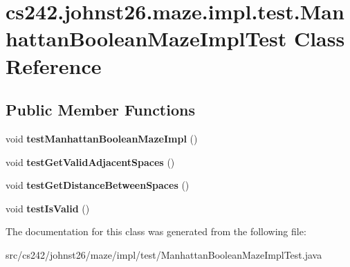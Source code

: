 \hypertarget{classcs242_1_1johnst26_1_1maze_1_1impl_1_1test_1_1_manhattan_boolean_maze_impl_test}{\section{cs242.\-johnst26.\-maze.\-impl.\-test.\-Manhattan\-Boolean\-Maze\-Impl\-Test Class Reference}
\label{classcs242_1_1johnst26_1_1maze_1_1impl_1_1test_1_1_manhattan_boolean_maze_impl_test}
}
\subsection*{Public Member Functions}
\begin{DoxyCompactItemize}
\item 
\hypertarget{classcs242_1_1johnst26_1_1maze_1_1impl_1_1test_1_1_manhattan_boolean_maze_impl_test_a801dfa6c57d9881a38e7dccedfca7fe4}{void {\bfseries test\-Manhattan\-Boolean\-Maze\-Impl} ()}\label{classcs242_1_1johnst26_1_1maze_1_1impl_1_1test_1_1_manhattan_boolean_maze_impl_test_a801dfa6c57d9881a38e7dccedfca7fe4}

\item 
\hypertarget{classcs242_1_1johnst26_1_1maze_1_1impl_1_1test_1_1_manhattan_boolean_maze_impl_test_a061886ff4c02d339433c1e258bcc86f2}{void {\bfseries test\-Get\-Valid\-Adjacent\-Spaces} ()}\label{classcs242_1_1johnst26_1_1maze_1_1impl_1_1test_1_1_manhattan_boolean_maze_impl_test_a061886ff4c02d339433c1e258bcc86f2}

\item 
\hypertarget{classcs242_1_1johnst26_1_1maze_1_1impl_1_1test_1_1_manhattan_boolean_maze_impl_test_a34cee0983384632ecd6b2a3dbb4b5032}{void {\bfseries test\-Get\-Distance\-Between\-Spaces} ()}\label{classcs242_1_1johnst26_1_1maze_1_1impl_1_1test_1_1_manhattan_boolean_maze_impl_test_a34cee0983384632ecd6b2a3dbb4b5032}

\item 
\hypertarget{classcs242_1_1johnst26_1_1maze_1_1impl_1_1test_1_1_manhattan_boolean_maze_impl_test_a9fda6603986cba3a9bce149d0013ff20}{void {\bfseries test\-Is\-Valid} ()}\label{classcs242_1_1johnst26_1_1maze_1_1impl_1_1test_1_1_manhattan_boolean_maze_impl_test_a9fda6603986cba3a9bce149d0013ff20}

\end{DoxyCompactItemize}


The documentation for this class was generated from the following file\-:\begin{DoxyCompactItemize}
\item 
src/cs242/johnst26/maze/impl/test/Manhattan\-Boolean\-Maze\-Impl\-Test.\-java\end{DoxyCompactItemize}
